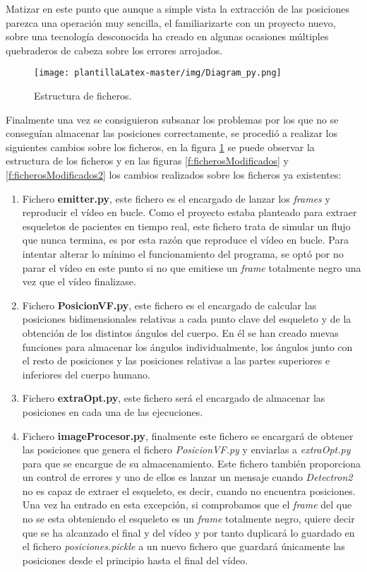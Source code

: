 Matizar en este punto que aunque a simple vista la extracción de las posiciones parezca una operación muy sencilla, el familiarizarte con un proyecto nuevo, sobre una tecnología desconocida ha creado en algunas ocasiones múltiples quebraderos de cabeza sobre los errores arrojados.

\begin{figure}[H]
    \centering
    \texttt{[image: plantillaLatex-master/img/Diagram\_py.png]}
    \caption{Estructura de ficheros.}
    \label{fig:Diagram_py}
\end{figure}

Finalmente una vez se consiguieron subsanar los problemas por los que no se conseguían almacenar las posiciones correctamente, se procedió a realizar los siguientes cambios sobre los ficheros, en la figura \ref{fig:Diagram_py} se puede observar la estructura de los ficheros y en las figuras \ref{f:ficherosModificados} y \ref{f:ficherosModificados2} los cambios realizados sobre los ficheros ya existentes:
\begin{enumerate}
    \item Fichero \textbf{emitter.py}, este fichero es el encargado de lanzar los \textit{frames} y reproducir el vídeo en bucle. Como el proyecto estaba planteado para  extraer esqueletos de pacientes en tiempo real, este fichero trata de simular un flujo que nunca termina, es por esta razón que reproduce el vídeo en bucle. Para intentar alterar lo mínimo el funcionamiento del programa, se optó por no parar el vídeo en este punto si no que emitiese un \textit{frame} totalmente negro una vez que el vídeo finalizase.
    \item Fichero \textbf{PosicionVF.py}, este fichero es el encargado de calcular las posiciones bidimensionales relativas a cada punto clave del esqueleto y de la obtención de los distintos ángulos del cuerpo. En él se han creado nuevas funciones para almacenar los ángulos individualmente, los ángulos junto con el resto de posiciones y las posiciones relativas a las partes superiores e inferiores del cuerpo humano.
    \item Fichero \textbf{extraOpt.py}, este fichero será el encargado de almacenar las posiciones en cada una de las ejecuciones. 
    \item Fichero \textbf{imageProcesor.py}, finalmente este fichero se encargará de obtener las posiciones que genera el fichero \textit{PosicionVF.py} y enviarlas a \textit{extraOpt.py} para que se encargue de su almacenamiento. Este fichero también proporciona un control de errores y uno de ellos es lanzar un mensaje cuando \textit{Detectron2} no es capaz de extraer el esqueleto, es decir, cuando no encuentra posiciones. Una vez ha entrado en esta excepción, si comprobamos que el \textit{frame} del que no se esta obteniendo el esqueleto es un \textit{frame} totalmente negro, quiere decir que se ha alcanzado el final y del vídeo y por tanto duplicará lo guardado en el fichero \textit{posiciones.pickle} a un nuevo fichero que guardará únicamente las posiciones desde el principio hasta el final del vídeo.
\end{enumerate}


